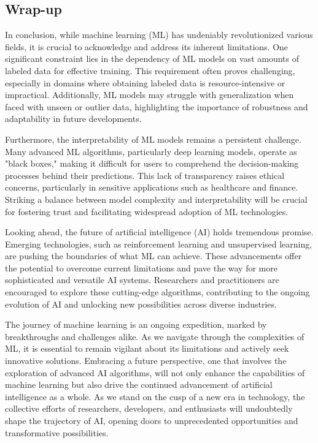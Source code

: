 \documentclass[12pt, twoside]{article}
\begin{document}
\begin{multicols*}{2}
\section{Wrap-up}
In conclusion, while machine learning (ML) has undeniably revolutionized various fields, it is crucial to acknowledge and address its inherent limitations. One significant constraint lies in the dependency of ML models on vast amounts of labeled data for effective training. This requirement often proves challenging, especially in domains where obtaining labeled data is resource-intensive or impractical. Additionally, ML models may struggle with generalization when faced with unseen or outlier data, highlighting the importance of robustness and adaptability in future developments.

Furthermore, the interpretability of ML models remains a persistent challenge. Many advanced ML algorithms, particularly deep learning models, operate as "black boxes," making it difficult for users to comprehend the decision-making processes behind their predictions. This lack of transparency raises ethical concerns, particularly in sensitive applications such as healthcare and finance. Striking a balance between model complexity and interpretability will be crucial for fostering trust and facilitating widespread adoption of ML technologies.

Looking ahead, the future of artificial intelligence (AI) holds tremendous promise. Emerging technologies, such as reinforcement learning and unsupervised learning, are pushing the boundaries of what ML can achieve. These advancements offer the potential to overcome current limitations and pave the way for more sophisticated and versatile AI systems. Researchers and practitioners are encouraged to explore these cutting-edge algorithms, contributing to the ongoing evolution of AI and unlocking new possibilities across diverse industries.

The journey of machine learning is an ongoing expedition, marked by breakthroughs and challenges alike. As we navigate through the complexities of ML, it is essential to remain vigilant about its limitations and actively seek innovative solutions. Embracing a future perspective, one that involves the exploration of advanced AI algorithms, will not only enhance the capabilities of machine learning but also drive the continued advancement of artificial intelligence as a whole. As we stand on the cusp of a new era in technology, the collective efforts of researchers, developers, and enthusiasts will undoubtedly shape the trajectory of AI, opening doors to unprecedented opportunities and transformative possibilities.


\printbibliography
		
\end{multicols*}
\end{document}
